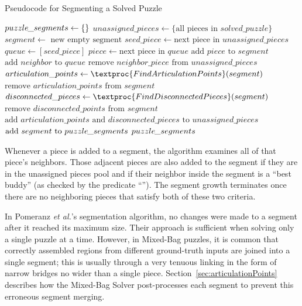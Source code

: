 \begin{algorithm}[t]
\caption{Pseudocode for Segmenting a Solved Puzzle}\label{alg:segmentPuzzle}
\begin{algorithmic}[1]
    \State $puzzle\hspace{-0.8pt}\_segments \gets \{ \}$
    \State $unassigned\_pieces \gets \{ \text{all pieces in } solved\_puzzle \}$
        \State $segment \gets \text{ new empty segment}$
        \State $seed\_piece \gets \text{next piece in } unassigned\_pieces$
        \State $queue \gets [seed\_piece]$
            \State $piece \gets \text{next piece in } queue$
            \State $\text{add } piece \text{ to } segment$
            		\State $\text{add } neighbor \text{ to } queue$
            		\State $\text{remove } neighbor\_piece \text{ from } unassigned\_pieces$
            	\EndIf
            \EndFor
        \EndWhile
        \State $articulation\_points \gets \textproc{FindArticulationPoints}(segment)$
        \State $\text{remove } articulation\_points \text{ from } \textit{segment}$
		\State $disconnected\_pieces \gets \textproc{FindDisconnectedPieces}(segment)$ 
		\State $\text{remove } disconnected\_points \text{ from } segment$
        \State $\text{add } \textit{articulation\_points} \text{ and } \textit{disconnected\_pieces} \text{ to } \textit{unassigned\_pieces}$               	
		\State $\text{add } segment \text{ to } puzzle\hspace{-0.8pt}\_segments$	
    \EndWhile
    \State \Return $puzzle\hspace{-0.8pt}\_segments$
\EndFunction
\end{algorithmic}
\end{algorithm}

Whenever a piece is added to a segment, the algorithm examines all of that piece's neighbors.  Those adjacent pieces are also added to the segment if they are in the unassigned pieces pool and if their neighbor inside the segment is a ``best buddy'' (as checked by the predicate ``'').  The segment growth terminates once there are no neighboring pieces that satisfy both of these two criteria. 

In Pomeranz \textit{et al.}'s segmentation algorithm, no changes were made to a segment after it reached its maximum size.  Their approach is sufficient when solving only a single puzzle at a time.  However, in Mixed-Bag puzzles, it is common that correctly assembled regions from different ground-truth inputs are joined into a single segment; this is usually through a very tenuous linking in the form of narrow bridges no wider than a single piece.  Section~\ref{sec:articulationPoints} describes how the Mixed-Bag Solver post-processes each segment to prevent this erroneous segment merging.

